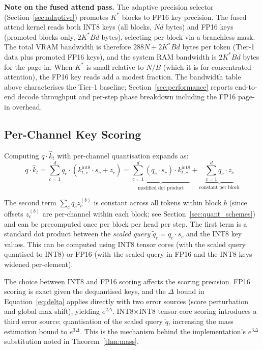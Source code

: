 \documentclass[11pt,a4paper]{article}
\theoremstyle{definition}
\theoremstyle{remark}
\begin{document}
\textbf{Note on the fused attend pass.}  The adaptive precision selector (Section~\ref{sec:adaptive}) promotes $K^*$ blocks to FP16 key precision.  The fused attend kernel reads both INT8 keys (all blocks, $Nd$ bytes) and FP16 keys (promoted blocks only, $2K^*Bd$ bytes), selecting per block via a branchless mask.  The total VRAM bandwidth is therefore $288N + 2K^*Bd$ bytes per token (Tier-1 data plus promoted FP16 keys), and the system RAM bandwidth is $2K^*Bd$ bytes for the page-in.  When $K^*$ is small relative to $N/B$ (which it is for concentrated attention), the FP16 key reads add a modest fraction.  The bandwidth table above characterises the Tier-1 baseline; Section~\ref{sec:performance} reports end-to-end decode throughput and per-step phase breakdown including the FP16 page-in overhead.

\subsection{Per-Channel Key Scoring}
\label{sec:scoring}

Computing $q \cdot \hat{k}_t$ with per-channel quantisation expands as:
\begin{equation}
  q \cdot \hat{k}_t = \sum_{c=1}^d q_c \cdot (k_{t,c}^{\mathrm{int8}} \cdot s_c + z_c)
  = \underbrace{\sum_{c=1}^d (q_c \cdot s_c) \cdot k_{t,c}^{\mathrm{int8}}}_{\text{modified dot product}} + \underbrace{\sum_{c=1}^d q_c \cdot z_c}_{\text{constant per block}}
\end{equation}

The second term $\sum_c q_c z_c^{(b)}$ is constant across all tokens within block $b$ (since offsets $z_c^{(b)}$ are per-channel within each block; see Section~\ref{sec:quant_schemes}) and can be precomputed once per block per head per step.  The first term is a standard dot product between the \emph{scaled query} $\tilde{q}_c = q_c \cdot s_c$ and the INT8 key values.  This can be computed using INT8 tensor cores (with the scaled query quantised to INT8) or FP16 (with the scaled query in FP16 and the INT8 keys widened per-element).

The choice between INT8 and FP16 scoring affects the scoring precision.  FP16 scoring is exact given the dequantised keys, and the $\Delta$ bound in Equation~\eqref{eq:delta} applies directly with two error sources (score perturbation and global-max shift), yielding $e^{2\Delta}$.  INT8$\times$INT8 tensor core scoring introduces a third error source: quantisation of the scaled query $\tilde{q}$, increasing the mass estimation bound to $e^{3\Delta}$.  This is the mechanism behind the implementation's $e^{3\Delta}$ substitution noted in Theorem~\ref{thm:mass}.
\end{document}
